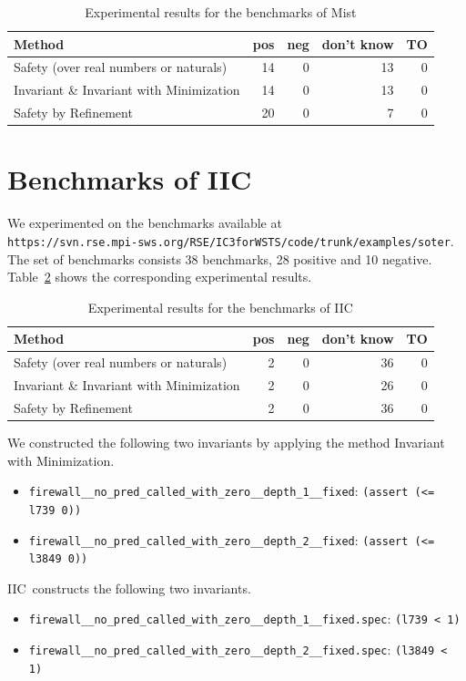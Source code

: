 \documentclass{article}
\newcommand{\mist}{{\sc Mist}}
\newcommand{\iic}{{\sc IIC}}
\newcommand{\ttt}[1]{\texttt{#1}}
\begin{document}
\begin{table}[h]
\begin{center}
  \begin{tabular}{ | p{6cm} | r | r | r | r | }
    \hline
    Method & pos & neg & don't know & TO \\
    \hline
    Safety (over real numbers or naturals)      & 14 &  0 & 13 &  0 \\
    Invariant \& Invariant with Minimization    & 14 &  0 & 13 &  0 \\
    Safety by Refinement                        & 20 &  0 &  7 &  0 \\
    \hline
  \end{tabular}
\end{center}
\caption{Experimental results for the benchmarks of \mist}
\label{mist-experiments}
\end{table}

\section{Benchmarks of \iic}

We experimented on the benchmarks available at \\
\ttt{https://svn.rse.mpi-sws.org/RSE/IC3forWSTS/code/trunk/examples/soter}.
The set of benchmarks consists 38 benchmarks, 28 positive and 10 negative.
Table~\ref{iic-experiments} shows the corresponding experimental results.

\begin{table}[h]
\begin{center}
  \begin{tabular}{ | p{6cm} | r | r | r | r | }
    \hline
    Method & pos & neg & don't know & TO \\
    \hline
    Safety (over real numbers or naturals)      & 2 & 0 & 36 & 0 \\
    Invariant \& Invariant with Minimization    & 2 & 0 & 26 & 0 \\
    Safety by Refinement                        & 2 & 0 & 36 & 0 \\
    \hline
  \end{tabular}
\end{center}
\caption{Experimental results for the benchmarks of \iic}
\label{iic-experiments}
\end{table}

We constructed the following two invariants by applying the method
Invariant with Minimization.

\begin{itemize}
\item \verb?firewall__no_pred_called_with_zero__depth_1__fixed?: \verb?(assert (<= l739 0))?
\item \verb?firewall__no_pred_called_with_zero__depth_2__fixed?: \verb?(assert (<= l3849 0))?
\end{itemize}

\iic\ constructs the following two invariants.

\begin{itemize}
\item \verb=firewall__no_pred_called_with_zero__depth_1__fixed.spec=: \verb=(l739 < 1)=
\item \verb=firewall__no_pred_called_with_zero__depth_2__fixed.spec=: \verb=(l3849 < 1)=
\end{itemize}

\fi
\end{document}
